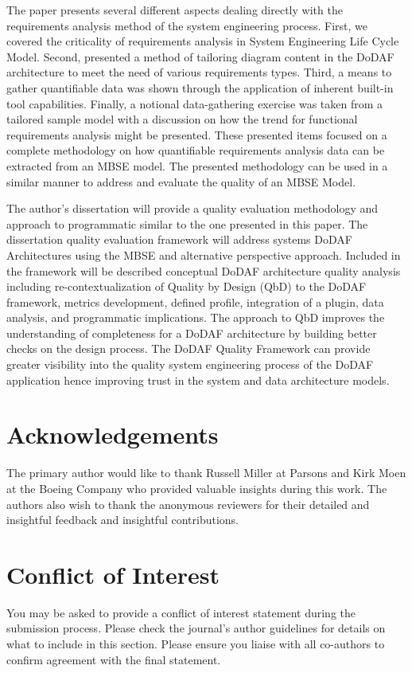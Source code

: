 \documentclass[num-refs]{wiley-article}
\begin{document}
The paper presents several different aspects dealing directly with the requirements analysis method of the system engineering process. First, we covered the criticality of requirements analysis in System Engineering Life Cycle Model. Second, presented a method of tailoring diagram content in the DoDAF architecture to meet the need of various requirements types. Third, a means to gather quantifiable data was shown through the application of inherent built-in tool capabilities. Finally, a notional data-gathering exercise was taken from a tailored sample model with a discussion on how the trend for functional requirements analysis might be presented. These presented items focused on a complete methodology on how quantifiable requirements analysis data can be extracted from an MBSE model. The presented methodology can be used in a similar manner to address and evaluate the quality of an MBSE Model. 

The author's dissertation will provide a quality evaluation methodology and approach to programmatic similar to the one presented in this paper. The dissertation quality evaluation framework will address systems DoDAF Architectures using the MBSE and alternative perspective approach. Included in the framework will be described conceptual DoDAF architecture quality analysis including re-contextualization of Quality by Design (QbD) to the DoDAF framework, metrics development, defined profile, integration of a plugin, data analysis, and programmatic implications.  The approach to QbD improves the understanding of completeness for a DoDAF architecture by building better checks on the design process. The DoDAF Quality Framework can provide greater visibility into the quality system engineering process of the DoDAF application hence improving trust in the system and data architecture models.

\section{Acknowledgements}
The primary author would like to thank Russell Miller at Parsons and Kirk Moen at the Boeing Company who provided valuable insights during this work. The authors also wish to thank the anonymous reviewers for their detailed and insightful feedback and insightful contributions.

\section{Conflict of Interest}
You may be asked to provide a conflict of interest statement during the submission process. Please check the journal's author guidelines for details on what to include in this section. Please ensure you liaise with all co-authors to confirm agreement with the final statement.
\end{document}
